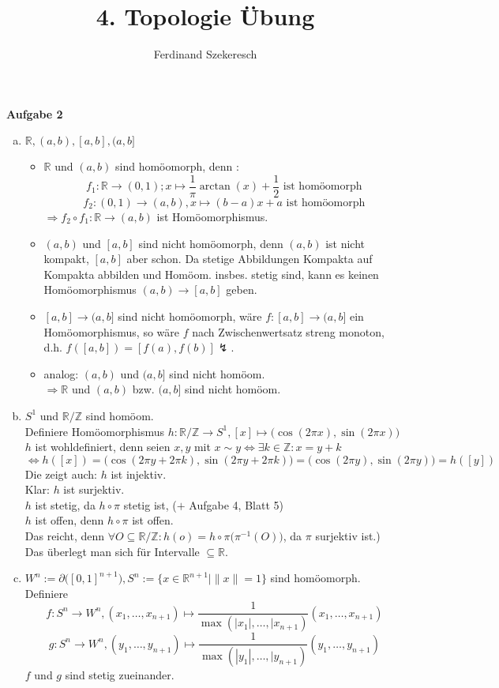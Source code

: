 \documentclass{article}
\title{4. Topologie Übung}
\author{Ferdinand Szekeresch}
\begin{document}
\maketitle

\textbf{Aufgabe 2}
\begin{enumerate}[a)]
\item $\mathbb{R}, (a,b), [a,b], (a,b]$\begin{itemize}
\item $\mathbb{R}$ und $(a,b)$ sind homöomorph, denn :\\
$$f_1 : \mathbb{R}\rightarrow (0,1); x\mapsto\frac{1}{\pi}\arctan(x)+\frac12 \text{ ist homöomorph}$$
$$f_2 : (0,1) \rightarrow (a,b), x\mapsto(b-a)x+a \text{ ist homöomorph}$$
$\Rightarrow f_2\circ f_1: \mathbb{R}\rightarrow(a,b)$ ist Homöomorphismus.
\item $(a,b)$ und $[a,b]$ sind nicht homöomorph, denn $(a,b)$ ist nicht kompakt, $[a,b]$ aber schon. Da stetige Abbildungen Kompakta auf Kompakta abbilden und Homöom. insbes. stetig sind, kann es keinen Homöomorphismus $(a,b)\rightarrow[a,b]$ geben.
\item $[a,b]\rightarrow(a,b]$ sind nicht homöomorph, wäre $f:[a,b]\rightarrow(a,b]$ ein Homöomorphismus, so wäre $f$ nach Zwischenwertsatz streng monoton, d.h. $f([a,b]) = [f(a),f(b)]\lightning$.
\item analog: $(a,b)$ und $(a,b]$ sind nicht homöom.\\
$\Rightarrow \mathbb{R}$ und $(a,b)$ bzw. $(a,b]$ sind nicht homöom.
\end{itemize}
\item $S^1$ und $\mathbb{R}/\mathbb{Z}$ sind homöom.\\
Definiere Homöomorphismus $h:\mathbb{R}/\mathbb{Z}\rightarrow S^1, [x]\mapsto \big(\cos(2\pi x),\sin(2\pi x)\big)$\\
$h$ ist wohldefiniert, denn seien $x,y$ mit $x\sim y \Leftrightarrow\exists k\in\mathbb{Z}:x=y+k$\\
$\Leftrightarrow h([x]) = \big(\cos(2\pi y + 2\pi k),\sin(2\pi y + 2\pi k)\big) = \big(\cos(2\pi y),\sin(2\pi y)\big) = h([y])$\\
Die zeigt auch: $h$ ist injektiv.\\
Klar: $h$ ist surjektiv.\\
$h$ ist stetig, da $h\circ\pi$ stetig ist, ($+$ Aufgabe 4, Blatt 5)\\
$h$ ist offen, denn $h\circ \pi$ ist offen.\\
Das reicht, denn $\forall O\subseteq\mathbb{R}/\mathbb{Z}: h(o) = h\circ\pi\big(\pi^{-1}(O)\big)$, da $\pi$ surjektiv ist.)\\
Das überlegt man sich für Intervalle $\subseteq\mathbb{R}$.
\pagebreak
\item $W^n:= \partial\big([0,1]^{n+1}\big), S^n :=\{x\in\mathbb{R}^{n+1}|\|x\|=1\}$ sind homöomorph.\\
Definiere $$f:S^n\rightarrow W^n, (x_1,\ldots,x_{n+1})\mapsto\frac{1}{\max(|x_1|,\ldots,|x_{n+1})}(x_1,\ldots,x_{n+1})$$
$$g:S^n\rightarrow W^n, (y_1,\ldots,y_{n+1})\mapsto\frac{1}{\max(|y_1|,\ldots,|y_{n+1})}(y_1,\ldots,y_{n+1})$$
$f$ und $g$ sind stetig zueinander.
\end{enumerate}
\end{document}
